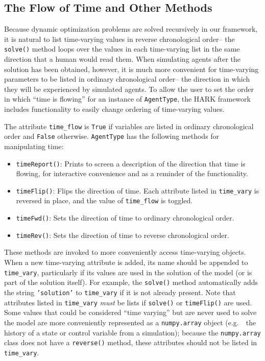 \documentclass[12pt,titlepage,letterpaper]{econtex}
\begin{document}
{\subsection{The Flow of Time and Other Methods}\label{sec:OtherMethods}

Because dynamic optimization problems are solved recursively in our framework, it is natural to list time-varying values in reverse chronological order-- the \texttt{solve()} method loops over the values in each time-varying list in the same direction that a human would read them.  When simulating agents after the solution has been obtained, however, it is much more convenient for time-varying parameters to be listed in ordinary chronological order-- the direction in which they will be experienced by simulated agents.  To allow the user to set the order in which ``time is flowing'' for an instance of \texttt{AgentType}, the HARK framework includes functionality to easily change ordering of time-varying values.

The attribute \texttt{time\_flow} is \texttt{True} if variables are listed in ordinary chronological order and \texttt{False} otherwise.  \texttt{AgentType} has the following methods for manipulating time:
\begin{itemize}
\item \texttt{timeReport()}: Prints to screen a description of the direction that time is flowing, for interactive convenience and as a reminder of the functionality.

\item \texttt{timeFlip()}: Flips the direction of time.  Each attribute listed in \texttt{time\_vary} is reversed in place, and the value of \texttt{time\_flow} is toggled.

\item \texttt{timeFwd()}: Sets the direction of time to ordinary chronological order.

\item \texttt{timeRev()}: Sets the direction of time to reverse chronological order.
\end{itemize}

These methods are invoked to more conveniently access time-varying objects.  When a new time-varying attribute is added, its name should be appended to \texttt{time\_vary}, particularly if its values are used in the solution of the model (or is part of the solution itself).  For example, the \texttt{solve()} method automatically adds the string \texttt{'solution'} to \texttt{time\_vary} if it is not already present.  Note that attributes listed in \texttt{time\_vary} \textit{must} be lists if \texttt{solve()} or \texttt{timeFlip()} are used.  Some values that could be considered ``time varying'' but are never used to solve the model are more conveniently represented as a \texttt{numpy.array} object (e.g.\ \ the history of a state or control variable from a simulation); because the \texttt{numpy.array} class does not have a \texttt{reverse()} method, these attributes should not be listed in \texttt{time\_vary}.

}
\end{document}
